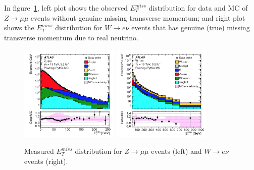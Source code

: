 In figure~\ref{fig:met_dis}, left plot shows the observed $E_{T}^{miss}$ distribution for data and MC of $Z \rightarrow \mu\mu$ events without genuine missing transverse momentum;
and right plot shows the $E_{T}^{miss}$ distribution for $W \rightarrow e\nu$ events that has genuine (true) missing transverse momentum due to real neutrino.
\begin{figure}[!htb]
  \centering
  \includegraphics[width=0.42\textwidth]{figures/Simulation/met_Zmm.png}
  \includegraphics[width=0.42\textwidth]{figures/Simulation/met_Wev.png}
  \caption{Measured $E_{T}^{miss}$ distribution for $Z \rightarrow \mu\mu$ events (left) and $W \rightarrow e\nu$ events (right). }
  \label{fig:met_dis}
\end{figure}
